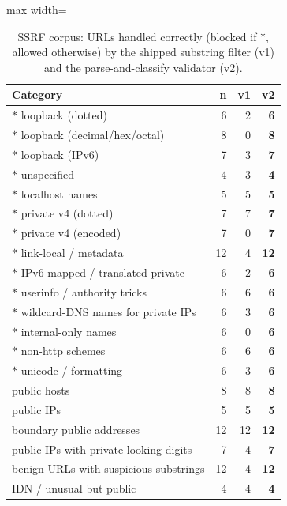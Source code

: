 \begin{table}
\caption{SSRF corpus: URLs handled correctly (blocked if $\ast$, allowed otherwise) by the shipped substring filter (v1) and the parse-and-classify validator (v2).}
\label{tab:ssrf}

\centering\footnotesize
\begin{adjustbox}{max width=\columnwidth}\begin{tabular}{l r rr}
\toprule
\textbf{Category} & \textbf{n} & \textbf{v1} & \textbf{v2} \\
\midrule
$\ast$ loopback (dotted) & 6 & 2 & \textbf{6} \\
$\ast$ loopback (decimal/hex/octal) & 8 & 0 & \textbf{8} \\
$\ast$ loopback (IPv6) & 7 & 3 & \textbf{7} \\
$\ast$ unspecified & 4 & 3 & \textbf{4} \\
$\ast$ localhost names & 5 & 5 & \textbf{5} \\
$\ast$ private v4 (dotted) & 7 & 7 & \textbf{7} \\
$\ast$ private v4 (encoded) & 7 & 0 & \textbf{7} \\
$\ast$ link-local / metadata & 12 & 4 & \textbf{12} \\
$\ast$ IPv6-mapped / translated private & 6 & 2 & \textbf{6} \\
$\ast$ userinfo / authority tricks & 6 & 6 & \textbf{6} \\
$\ast$ wildcard-DNS names for private IPs & 6 & 3 & \textbf{6} \\
$\ast$ internal-only names & 6 & 0 & \textbf{6} \\
$\ast$ non-http schemes & 6 & 6 & \textbf{6} \\
$\ast$ unicode / formatting & 6 & 3 & \textbf{6} \\
public hosts & 8 & 8 & \textbf{8} \\
public IPs & 5 & 5 & \textbf{5} \\
boundary public addresses & 12 & 12 & \textbf{12} \\
public IPs with private-looking digits & 7 & 4 & \textbf{7} \\
benign URLs with suspicious substrings & 12 & 4 & \textbf{12} \\
IDN / unusual but public & 4 & 4 & \textbf{4} \\
\bottomrule
\end{tabular}\end{adjustbox}
\end{table}
